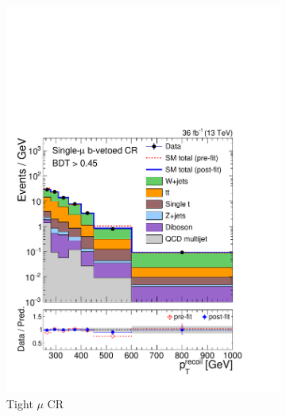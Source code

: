 \begin{figure}[]
\begin{center}
\begin{subfigure}[t]{0.24\textwidth}
            \includegraphics[width=\textwidth]{figures/monotop/postfit/stackedPostfit_singlemuonw_monotop.pdf}
            \caption{Tight $\mu$ CR}
        \end{subfigure}
        \begin{subfigure}[t]{0.24\textwidth}

\end{subfigure}
\end{center}
\end{figure}
